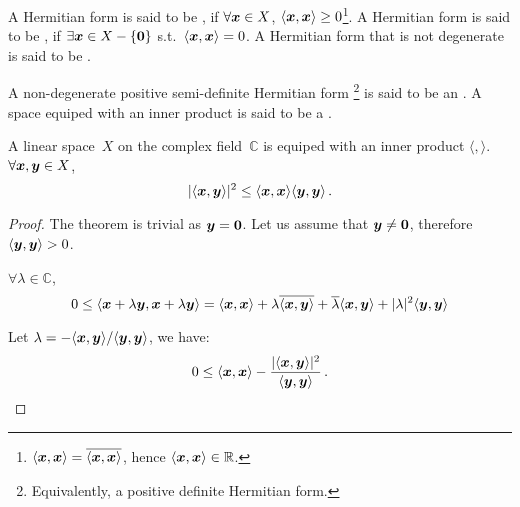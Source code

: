 \documentclass[openany]{book}
\begin{document}
A Hermitian form is said to be , if $\forall \boldsymbol{x} \in X$, $\langle \boldsymbol{x}, \boldsymbol{x} \rangle \geq 0$\footnote{%
	$\langle \boldsymbol{x}, \boldsymbol{x}\rangle = \overline{\langle \boldsymbol{x}, \boldsymbol{x}\rangle}$, hence $\langle \boldsymbol{x}, \boldsymbol{x}\rangle \in \mathbb R$.%
}.
A Hermitian form is said to be , if $\exists \boldsymbol{x} \in X - \{\boldsymbol{0}\}$ s.t.\ $\langle \boldsymbol{x}, \boldsymbol{x} \rangle = 0$. 
A Hermitian form that is not degenerate is said to be .

\begin{definition}
	A non-degenerate positive semi-definite Hermitian form%
		\footnote{Equivalently, a positive definite Hermitian form.}%
	is said to be an . 
	A space equiped with an inner product is said to be a .
\end{definition}

\begin{theorem}\label{theorem: Cauchy-Bunyakovskii}%
	A linear space~$X$ on the complex field~$\mathbb C$ is equiped with an inner product $\langle , \rangle$. $\forall \boldsymbol{x}, \boldsymbol{y} \in X$, 
	\begin{equation}
		|\langle \boldsymbol{x}, \boldsymbol{y} \rangle|^2 
			\leq \langle \boldsymbol{x}, \boldsymbol{x} \rangle \langle \boldsymbol{y}, \boldsymbol{y} \rangle\,.
	\end{equation}
\end{theorem}
\begin{proof}
	The theorem is trivial as $\boldsymbol{y} = \boldsymbol{0}$. Let us assume that $\boldsymbol{y} \neq \boldsymbol{0}$, therefore $\langle \boldsymbol{y}, \boldsymbol{y}\rangle > 0$.

	$\forall \lambda \in \mathbb C$, 
	\begin{equation*}
		0 \leq \langle \boldsymbol{x} + \lambda \boldsymbol{y}, \boldsymbol{x} + \lambda \boldsymbol{y} \rangle
			= \langle \boldsymbol{x}, \boldsymbol{x} \rangle + \lambda \overline{\langle \boldsymbol{x}, \boldsymbol{y} \rangle} + \overline \lambda \langle \boldsymbol{x}, \boldsymbol{y} \rangle + |\lambda|^2\langle \boldsymbol{y}, \boldsymbol{y} \rangle 
	\end{equation*}

	Let $\lambda = - \langle \boldsymbol{x}, \boldsymbol{y} \rangle / \langle \boldsymbol{y}, \boldsymbol{y}\rangle$, we have:
	\begin{equation*}
		0 \leq \langle \boldsymbol{x}, \boldsymbol{x} \rangle 
			- \frac{ |\langle \boldsymbol{x}, \boldsymbol{y} \rangle|^2}{\langle \boldsymbol{y}, \boldsymbol{y} \rangle}
			\,. 
	\end{equation*}
\end{proof}
\end{document}
